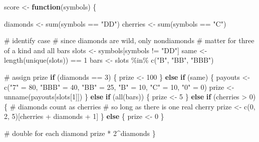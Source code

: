 \documentclass[
  letterpaper,
  DIV=11,
  numbers=noendperiod]{scrbook}
\newenvironment{Shaded}{\begin{snugshade}}{\end{snugshade}}
\newcommand{\CommentTok}[1]{\textcolor[rgb]{0.37,0.37,0.37}{#1}}
\newcommand{\ControlFlowTok}[1]{\textcolor[rgb]{0.00,0.23,0.31}{\textbf{#1}}}
\newcommand{\DecValTok}[1]{\textcolor[rgb]{0.68,0.00,0.00}{#1}}
\newcommand{\FunctionTok}[1]{\textcolor[rgb]{0.28,0.35,0.67}{#1}}
\newcommand{\NormalTok}[1]{\textcolor[rgb]{0.00,0.23,0.31}{#1}}
\newcommand{\OtherTok}[1]{\textcolor[rgb]{0.00,0.23,0.31}{#1}}
\newcommand{\SpecialCharTok}[1]{\textcolor[rgb]{0.37,0.37,0.37}{#1}}
\newcommand{\StringTok}[1]{\textcolor[rgb]{0.13,0.47,0.30}{#1}}
\begin{document}
\begin{Shaded}
\begin{Highlighting}[]
\NormalTok{score }\OtherTok{\textless{}{-}} \ControlFlowTok{function}\NormalTok{(symbols) \{}
  
\NormalTok{  diamonds }\OtherTok{\textless{}{-}} \FunctionTok{sum}\NormalTok{(symbols }\SpecialCharTok{==} \StringTok{"DD"}\NormalTok{)}
\NormalTok{  cherries }\OtherTok{\textless{}{-}} \FunctionTok{sum}\NormalTok{(symbols }\SpecialCharTok{==} \StringTok{"C"}\NormalTok{)}
  
  \CommentTok{\# identify case}
  \CommentTok{\# since diamonds are wild, only nondiamonds }
  \CommentTok{\# matter for three of a kind and all bars}
\NormalTok{  slots }\OtherTok{\textless{}{-}}\NormalTok{ symbols[symbols }\SpecialCharTok{!=} \StringTok{"DD"}\NormalTok{]}
\NormalTok{  same }\OtherTok{\textless{}{-}} \FunctionTok{length}\NormalTok{(}\FunctionTok{unique}\NormalTok{(slots)) }\SpecialCharTok{==} \DecValTok{1}
\NormalTok{  bars }\OtherTok{\textless{}{-}}\NormalTok{ slots }\SpecialCharTok{\%in\%} \FunctionTok{c}\NormalTok{(}\StringTok{"B"}\NormalTok{, }\StringTok{"BB"}\NormalTok{, }\StringTok{"BBB"}\NormalTok{)}

  \CommentTok{\# assign prize}
  \ControlFlowTok{if}\NormalTok{ (diamonds }\SpecialCharTok{==} \DecValTok{3}\NormalTok{) \{}
\NormalTok{    prize }\OtherTok{\textless{}{-}} \DecValTok{100}
\NormalTok{  \} }\ControlFlowTok{else} \ControlFlowTok{if}\NormalTok{ (same) \{}
\NormalTok{    payouts }\OtherTok{\textless{}{-}} \FunctionTok{c}\NormalTok{(}\StringTok{"7"} \OtherTok{=} \DecValTok{80}\NormalTok{, }\StringTok{"BBB"} \OtherTok{=} \DecValTok{40}\NormalTok{, }\StringTok{"BB"} \OtherTok{=} \DecValTok{25}\NormalTok{,}
      \StringTok{"B"} \OtherTok{=} \DecValTok{10}\NormalTok{, }\StringTok{"C"} \OtherTok{=} \DecValTok{10}\NormalTok{, }\StringTok{"0"} \OtherTok{=} \DecValTok{0}\NormalTok{)}
\NormalTok{    prize }\OtherTok{\textless{}{-}} \FunctionTok{unname}\NormalTok{(payouts[slots[}\DecValTok{1}\NormalTok{]])}
\NormalTok{  \} }\ControlFlowTok{else} \ControlFlowTok{if}\NormalTok{ (}\FunctionTok{all}\NormalTok{(bars)) \{}
\NormalTok{    prize }\OtherTok{\textless{}{-}} \DecValTok{5}
\NormalTok{  \} }\ControlFlowTok{else} \ControlFlowTok{if}\NormalTok{ (cherries }\SpecialCharTok{\textgreater{}} \DecValTok{0}\NormalTok{) \{}
    \CommentTok{\# diamonds count as cherries}
    \CommentTok{\# so long as there is one real cherry}
\NormalTok{    prize }\OtherTok{\textless{}{-}} \FunctionTok{c}\NormalTok{(}\DecValTok{0}\NormalTok{, }\DecValTok{2}\NormalTok{, }\DecValTok{5}\NormalTok{)[cherries }\SpecialCharTok{+}\NormalTok{ diamonds }\SpecialCharTok{+} \DecValTok{1}\NormalTok{]}
\NormalTok{  \} }\ControlFlowTok{else}\NormalTok{ \{}
\NormalTok{    prize }\OtherTok{\textless{}{-}} \DecValTok{0}
\NormalTok{  \}}
  
  \CommentTok{\# double for each diamond}
\NormalTok{  prize }\SpecialCharTok{*} \DecValTok{2}\SpecialCharTok{\^{}}\NormalTok{diamonds}
\NormalTok{\}}
\end{Highlighting}
\end{Shaded}
\end{document}

